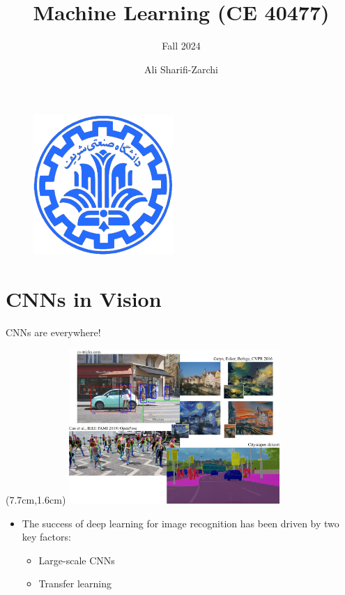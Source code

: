 \documentclass[serif, aspectratio=169]{beamer}
\author{Ali Sharifi-Zarchi}
\title{Machine Learning (CE 40477)}
\subtitle{Fall 2024}
\institute{
    CE Department \\
    Sharif University of Technology
}
\begin{document}
\begin{frame}
    \titlepage
    \vspace*{-0.6cm}
    \begin{figure}[htpb]
        \begin{center}
            \includegraphics[keepaspectratio, scale=0.25]{pic/sharif-main-logo}
        \end{center}
    \end{figure}
\end{frame}

\begin{frame}    
\tableofcontents[sectionstyle=show,
subsectionstyle=show/shaded/hide,
subsubsectionstyle=show/shaded/hide]
\end{frame}

\section{CNNs in Vision}

\begin{frame}{CNNs are everywhere!}

	\begin{textblock*}{5cm}(7.7cm,1.6cm) %
			\includegraphics[keepaspectratio, width=8cm]{pic/CNNs}
	\end{textblock*}
	
	\begin{itemize}
		\item The success of deep learning for \newline image recognition has been driven \newline by two key factors:
		\begin{itemize}
			\item Large-scale CNNs
			\item Transfer learning
		\end{itemize}
	\end{itemize}
\end{frame}
\end{document}
